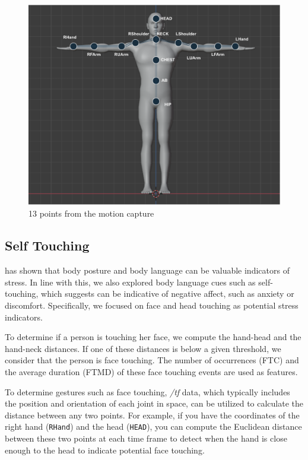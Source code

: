 \begin{figure}[h]
	\centering
	\includegraphics[width=0.8\columnwidth]{images/humandraw.pdf}
	\caption{13 points from the motion capture} 
	\label{fig:human1}
\end{figure}
\subsection*{Self Touching} 
\textcite{10.1371/journal.pone.0043571} has shown that body posture and body language can be valuable indicators of stress. In line with this, we also explored body language cues such as self-touching, which \textcite{HARRIGAN19851161}suggests can be indicative of negative affect, such as anxiety or discomfort. Specifically, we focused on face and head touching as potential stress indicators.

To determine if a person is touching her face, we compute the hand-head and the hand-neck distances. If one of these distances is below a given threshold, we consider that the person is face touching. The number of occurrences (FTC) and the average duration (FTMD) of these face touching events are used as features. 

To determine gestures such as face touching, \textit{/tf} data, which typically includes the position and orientation of each joint in space, can be utilized to calculate the distance between any two points. For example, if you have the coordinates of the right hand (\texttt{RHand}) and the head (\texttt{HEAD}), you can compute the Euclidean distance between these two points at each time frame to detect when the hand is close enough to the head to indicate potential face touching.


